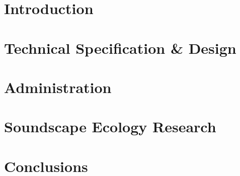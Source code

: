 \documentclass[12pt, twoside]{article}
\begin{document}
  
  \pagestyle{empty}                                     %
  \tableofcontents
  \newpage


  \pagestyle{plain} %
  \setcounter{page}{1}

  \section{Introduction}
  
  
  
  
  \newpage

  \section{Technical Specification \& Design}
  
  
  
  
  
  
  
  
  
  
  
  
  
  
  
  
  \newpage

  \section{Administration}
  
  
  
  \newpage

  \section{Soundscape Ecology Research}
  
  
  
  
  \newpage

  \section{Conclusions}
  
  
  
  \newpage

  \thispagestyle{empty}
  \printbibliography
\end{document}
